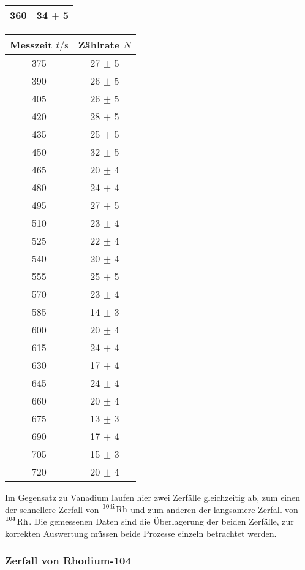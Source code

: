 \begin{table} [H]
\begin{tabular}{c c}
      360 &  34 $\pm$ 5 \\
      \bottomrule
    \end{tabular}
    \begin{tabular}{c c}
      \toprule
      Messzeit $t/\unit{\second}$ & Zählrate $N$\\
      \midrule
      375 &  27 $\pm$ 5 \\
      390 & 26 $\pm$ 5 \\
      405 & 26 $\pm$ 5 \\
      420 & 28 $\pm$ 5 \\
      435 & 25 $\pm$ 5 \\
      450 & 32 $\pm$ 5 \\
      465 & 20 $\pm$ 4 \\
      480 & 24 $\pm$ 4 \\
      495 & 27 $\pm$ 5 \\
      510 & 23 $\pm$ 4 \\
      525 & 22 $\pm$ 4 \\
      540 & 20 $\pm$ 4 \\
      555 & 25 $\pm$ 5 \\
      570 & 23 $\pm$ 4 \\
      585 & 14 $\pm$ 3 \\
      600 & 20 $\pm$ 4 \\
      615 & 24 $\pm$ 4 \\
      630 & 17 $\pm$ 4 \\
      645 & 24 $\pm$ 4 \\
      660 & 20 $\pm$ 4 \\
      675 & 13 $\pm$ 3 \\
      690 & 17 $\pm$ 4 \\
      705 & 15 $\pm$ 3 \\
      720 & 20 $\pm$ 4 \\
      \bottomrule
    \end{tabular}
\end{table}

Im Gegensatz zu Vanadium laufen hier zwei Zerfälle gleichzeitig ab, zum einen der schnellere Zerfall von
$\ce{^{104\text{i}} Rh}$ und zum anderen der langsamere Zerfall von $\ce{^104 Rh}$.
Die gemessenen Daten sind die Überlagerung der beiden Zerfälle, zur korrekten Auswertung müssen beide
Prozesse einzeln betrachtet werden.

\subsubsection{Zerfall von Rhodium-104}

